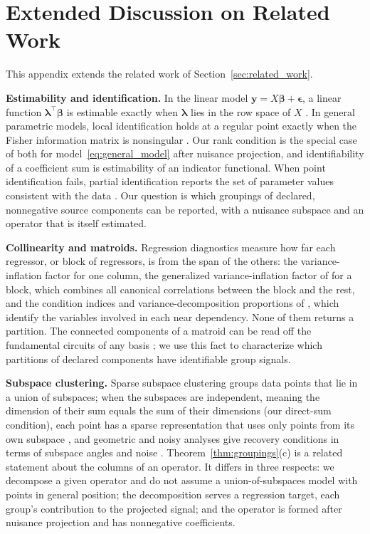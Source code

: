 \section{Extended Discussion on Related Work}
\label{app:extended_related_work}

This appendix extends the related work of Section~\ref{sec:related_work}.

\noindent\textbf{Estimability and identification.}
In the linear model \(\mathbf y=X\boldsymbol\beta+\boldsymbol\epsilon\), a linear
function \(\boldsymbol\lambda^\top\boldsymbol\beta\) is estimable exactly when
\(\boldsymbol\lambda\) lies in the row space of \(X\) \citep{searle1971linear}.  In
general parametric models, local identification holds at a regular point exactly
when the Fisher information matrix is nonsingular \citep{rothenberg1971identification}.
Our rank condition is the special case of both for model~\eqref{eq:general_model}
after nuisance projection, and identifiability of a coefficient sum is estimability of
an indicator functional.  When point identification fails, partial identification
reports the set of parameter values consistent with the data
\citep{manski2003partial}.  Our question is which groupings of declared, nonnegative
source components can be reported, with a nuisance subspace and an operator that is
itself estimated.

\noindent\textbf{Collinearity and matroids.}
Regression diagnostics measure how far each regressor, or block of regressors, is
from the span of the others: the variance-inflation factor for one column, the
generalized variance-inflation factor of \citet{fox1992generalized} for a block, which
combines all canonical correlations between the block and the rest, and the condition
indices and variance-decomposition proportions of \citet{belsley1980regression},
which identify the variables involved in each near dependency.  None of them returns a
partition.  The connected components of a matroid can be read off the fundamental
circuits of any basis \citep{krogdahl1977dependence,oxley2011matroid}; we use this
fact to characterize which partitions of declared components have identifiable group
signals.

\noindent\textbf{Subspace clustering.}
Sparse subspace clustering groups data points that lie in a union of subspaces; when
the subspaces are independent, meaning the dimension of their sum equals the sum of
their dimensions (our direct-sum condition), each point has a sparse representation
that uses only points from its own subspace \citep{elhamifar2013sparse}, and geometric
and noisy analyses give recovery conditions in terms of subspace angles and noise
\citep{soltanolkotabi2012geometric,wang2016noisy}.  Theorem~\ref{thm:groupings}(c) is
a related statement about the columns of an operator.  It differs in three respects:
we decompose a given operator and do not assume a union-of-subspaces model with points
in general position; the decomposition serves a regression target, each group's
contribution to the projected signal; and the operator is formed after nuisance
projection and has nonnegative coefficients.

